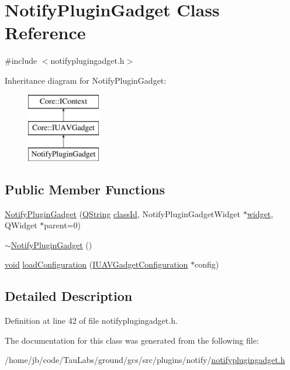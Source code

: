 \hypertarget{class_notify_plugin_gadget}{\section{\-Notify\-Plugin\-Gadget \-Class \-Reference}
\label{class_notify_plugin_gadget}
}


{\ttfamily \#include $<$notifyplugingadget.\-h$>$}

\-Inheritance diagram for \-Notify\-Plugin\-Gadget\-:\begin{figure}[H]
\begin{center}
\leavevmode
\includegraphics[height=3.000000cm]{class_notify_plugin_gadget}
\end{center}
\end{figure}
\subsection*{\-Public \-Member \-Functions}
\begin{DoxyCompactItemize}
\item 
\hyperlink{group___notify_plugin_ga2550c9c08be7f6731350a3be6fbaba4a}{\-Notify\-Plugin\-Gadget} (\hyperlink{group___u_a_v_objects_plugin_gab9d252f49c333c94a72f97ce3105a32d}{\-Q\-String} \hyperlink{group___core_plugin_ga3878fde66a57220608960bcc3fbeef2c}{class\-Id}, \-Notify\-Plugin\-Gadget\-Widget $\ast$\hyperlink{group___core_plugin_gac74c76eef51e24e62a333fe0fd940cf6}{widget}, \-Q\-Widget $\ast$parent=0)
\item 
\hyperlink{group___notify_plugin_ga2b03f730db4ecb4673e46a323c9cbc45}{$\sim$\-Notify\-Plugin\-Gadget} ()
\item 
\hyperlink{group___u_a_v_objects_plugin_ga444cf2ff3f0ecbe028adce838d373f5c}{void} \hyperlink{group___notify_plugin_gad7b898c97fa3c65ea707934881f356e5}{load\-Configuration} (\hyperlink{class_core_1_1_i_u_a_v_gadget_configuration}{\-I\-U\-A\-V\-Gadget\-Configuration} $\ast$config)
\end{DoxyCompactItemize}


\subsection{\-Detailed \-Description}


\-Definition at line 42 of file notifyplugingadget.\-h.



\-The documentation for this class was generated from the following file\-:\begin{DoxyCompactItemize}
\item 
/home/jb/code/\-Tau\-Labs/ground/gcs/src/plugins/notify/\hyperlink{notifyplugingadget_8h}{notifyplugingadget.\-h}\end{DoxyCompactItemize}
